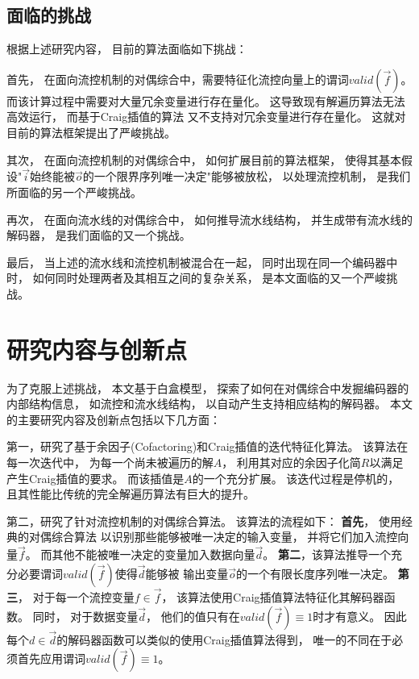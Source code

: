 \subsection{面临的挑战}

根据上述研究内容，
目前的算法面临如下挑战：

首先，
在面向流控机制的对偶综合中，需要特征化流控向量上的谓词$valid(\vec{f})$。
而该计算过程中需要对大量冗余变量进行存在量化。
这导致现有解遍历算法无法高效运行，
而基于Craig插值的算法 又不支持对冗余变量进行存在量化。
这就对目前的算法框架提出了严峻挑战。


其次，
在面向流控机制的对偶综合中，
如何扩展目前的算法框架，
使得其基本假设"$\vec{i}$始终能被$\vec{o}$的一个限界序列唯一决定"能够被放松，
以处理流控机制，
是我们所面临的另一个严峻挑战。

再次，
在面向流水线的对偶综合中，
如何推导流水线结构，
并生成带有流水线的解码器，
是我们面临的又一个挑战。

最后，
当上述的流水线和流控机制被混合在一起，
同时出现在同一个编码器中时，
如何同时处理两者及其相互之间的复杂关系，
是本文面临的又一个严峻挑战。






\section{研究内容与创新点}\label{sec_contest_innov}
为了克服上述挑战，
本文基于白盒模型，
探索了如何在对偶综合中发掘编码器的内部结构信息，
如流控和流水线结构，
以自动产生支持相应结构的解码器。
本文的主要研究内容及创新点包括以下几方面：




第一，研究了基于余因子(Cofactoring)和Craig插值的迭代特征化算法。
该算法在每一次迭代中，
为每一个尚未被遍历的解$A$，
利用其对应的余因子化简$R$以满足产生Craig插值的要求。
而该插值是$A$的一个充分扩展。
该迭代过程是停机的，
且其性能比传统的完全解遍历算法有巨大的提升。

第二，研究了针对流控机制的对偶综合算法。
该算法的流程如下：
\textbf{首先}，
使用经典的对偶综合算法
以识别那些能够被唯一决定的输入变量，
并将它们加入流控向量$\vec{f}$。
而其他不能被唯一决定的变量加入数据向量$\vec{d}$。
\textbf{第二}，该算法推导一个充分必要谓词$valid(\vec{f})$使得$\vec{d}$能够被
输出变量$\vec{o}$的一个有限长度序列唯一决定。
\textbf{第三}，
对于每一个流控变量$f\in\vec{f}$，
该算法使用Craig插值算法特征化其解码器函数。
同时，
对于数据变量$\vec{d}$，
他们的值只有在$valid(\vec{f}) \equiv 1$时才有意义。
因此每个$d\in\vec{d}$的解码器函数可以类似的使用Craig插值算法得到，
唯一的不同在于必须首先应用谓词$valid(\vec{f}) \equiv 1$。




